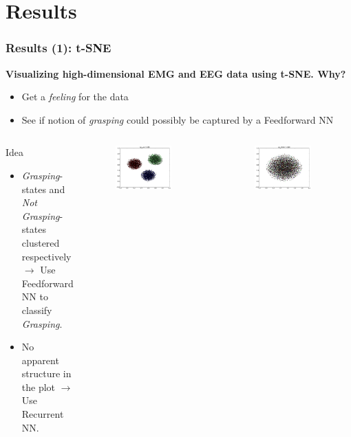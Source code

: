 \documentclass{beamer}
\begin{document}
\section{Results}


\begin{frame}
	\frametitle{Results (1): t-SNE}
	\textbf{Visualizing high-dimensional EMG and EEG data using t-SNE. Why?}
	\begin{itemize}
		\item Get a \emph{feeling} for the data
		\item See if notion of \emph{grasping} could possibly be captured by a Feedforward NN
	\end{itemize}
	\begin{columns}
		\begin{block}{Idea}
		\begin{itemize}
			\item \emph{Grasping}-states and \emph{Not Grasping}-states clustered respectively $\rightarrow$ Use Feedforward NN to classify \emph{Grasping}.
			\item No apparent structure in the plot $\rightarrow$ Use Recurrent NN.
		\end{itemize}
		\end{block}
		\begin{figure}[ht]
			\centering
			\includegraphics[width=0.8\textwidth, trim={2cm 2.5cm 2cm 2cm},clip]{images/cluster.png}
		\end{figure}
		\begin{figure}[ht]
			\centering
			\includegraphics[width=0.8\textwidth, trim={2cm 2cm 2cm 2.5cm},clip]{images/nocluster.png}

\end{figure}
\end{columns}
\end{frame}
\end{document}
